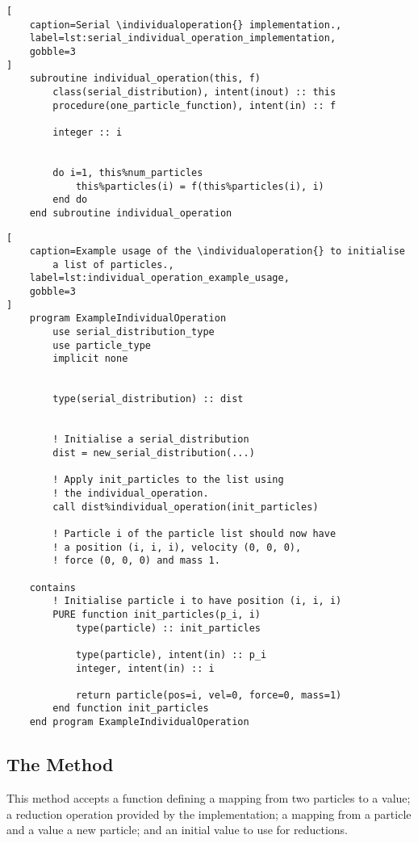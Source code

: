 \begin{lstlisting}[
    caption=Serial \individualoperation{} implementation.,
    label=lst:serial_individual_operation_implementation,
    gobble=3
]
    subroutine individual_operation(this, f)
        class(serial_distribution), intent(inout) :: this
        procedure(one_particle_function), intent(in) :: f

        integer :: i


        do i=1, this%num_particles
            this%particles(i) = f(this%particles(i), i)
        end do
    end subroutine individual_operation
\end{lstlisting}

\begin{lstlisting}[
    caption=Example usage of the \individualoperation{} to initialise
        a list of particles.,
    label=lst:individual_operation_example_usage,
    gobble=3
]
    program ExampleIndividualOperation
        use serial_distribution_type
        use particle_type
        implicit none


        type(serial_distribution) :: dist

    
        ! Initialise a serial_distribution
        dist = new_serial_distribution(...)

        ! Apply init_particles to the list using
        ! the individual_operation.
        call dist%individual_operation(init_particles)

        ! Particle i of the particle list should now have
        ! a position (i, i, i), velocity (0, 0, 0),
        ! force (0, 0, 0) and mass 1.

    contains
        ! Initialise particle i to have position (i, i, i)
        PURE function init_particles(p_i, i)
            type(particle) :: init_particles

            type(particle), intent(in) :: p_i
            integer, intent(in) :: i

            return particle(pos=i, vel=0, force=0, mass=1)
        end function init_particles
    end program ExampleIndividualOperation
\end{lstlisting}


\subsection{The \pairoperation{} Method}
\label{sec:the_pair_operation_method}

This method accepts
a function defining a mapping from two particles to a value;
a reduction operation provided by the implementation;
a mapping from a particle and a value a new particle;
and an initial value to use for reductions.

